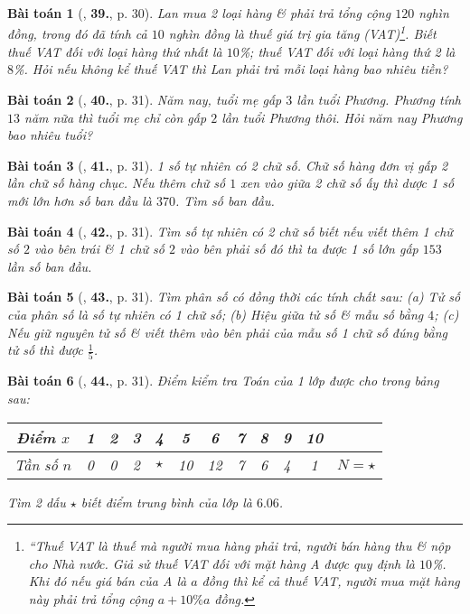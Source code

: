 \documentclass{article}
\numberwithin{equation}{section}
\newtheorem{baitoan}{Bài toán}
\begin{document}
\begin{baitoan}[\cite{SGK_Toan_8_tap_2}, \textbf{39.}, p. 30]
	Lan mua 2 loại hàng \& phải trả tổng cộng $120$ nghìn đồng, trong đó đã tính cả $10$ nghìn đồng là thuế giá trị gia tăng (VAT)\footnote{``Thuế VAT là thuế mà người mua hàng phải trả, người bán hàng thu \& nộp cho Nhà nước. Giả sử thuế VAT đối với mặt hàng A được quy định là $10$\%. Khi đó nếu giá bán của A là $a$ đồng thì kể cả thuế VAT, người mua mặt hàng này phải trả tổng cộng $a + 10\%a$ đồng.}. Biết thuế VAT đối với loại hàng thứ nhất là $10$\%; thuế VAT đối với loại hàng thứ 2 là $8$\%. Hỏi nếu không kể thuế VAT thì Lan phải trả mỗi loại hàng bao nhiêu tiền?
\end{baitoan}

\begin{baitoan}[\cite{SGK_Toan_8_tap_2}, \textbf{40.}, p. 31]
	Năm nay, tuổi mẹ gấp $3$ lần tuổi Phương. Phương tính $13$ năm nữa thì tuổi mẹ chỉ còn gấp $2$ lần tuổi Phương thôi. Hỏi năm nay Phương bao nhiêu tuổi?
\end{baitoan}

\begin{baitoan}[\cite{SGK_Toan_8_tap_2}, \textbf{41.}, p. 31]
	1 số tự nhiên có 2 chữ số. Chữ số hàng đơn vị gấp 2 lần chữ số hàng chục. Nếu thêm chữ số $1$ xen vào giữa 2 chữ số ấy thì dược 1 số mới lớn hơn số ban đầu là $370$. Tìm số ban đầu.
\end{baitoan}

\begin{baitoan}[\cite{SGK_Toan_8_tap_2}, \textbf{42.}, p. 31]
	Tìm số tự nhiên có 2 chữ số biết nếu viết thêm 1 chữ số $2$ vào bên trái \& 1 chữ số $2$ vào bên phải số đó thì ta được 1 số lớn gấp $153$ lần số ban đầu.
\end{baitoan}

\begin{baitoan}[\cite{SGK_Toan_8_tap_2}, \textbf{43.}, p. 31]
	Tìm phân số có đồng thời các tính chất sau: (a) Tử số của phân số là số tự nhiên có 1 chữ số; (b) Hiệu giữa tử số \& mẫu số bằng $4$; (c) Nếu giữ nguyên tử số \& viết thêm vào bên phải của mẫu số 1 chữ số đúng bằng tử số thì được $\frac{1}{5}$.
\end{baitoan}

\begin{baitoan}[\cite{SGK_Toan_8_tap_2}, \textbf{44.}, p. 31]
	Điểm kiểm tra Toán của 1 lớp được cho trong bảng sau:
	\begin{table}[H]
		\centering
		\begin{tabular}{|c|c|c|c|c|c|c|c|c|c|c|c|}
			\hline
			Điểm $x$ & 1 & 2 & 3 & 4 & 5 & 6 & 7 & 8 & 9 & 10 &  \\
			\hline
			Tần số $n$ & 0 & 0 & 2 & $\star$ & 10 & 12 & 7 & 6 & 4 & 1 & $N = \star$ \\
			\hline
		\end{tabular}
	\end{table}
	Tìm 2 dấu $\star$ biết điểm trung bình của lớp là $6.06$.
\end{baitoan}
\end{document}
